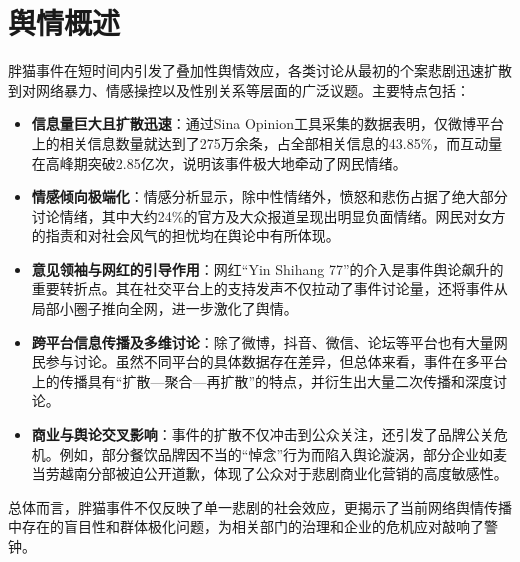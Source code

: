 \documentclass{article}
\begin{document}
\section{舆情概述}
胖猫事件在短时间内引发了叠加性舆情效应，各类讨论从最初的个案悲剧迅速扩散到对网络暴力、情感操控以及性别关系等层面的广泛议题。主要特点包括：
\begin{itemize}
    \item \textbf{信息量巨大且扩散迅速}：通过Sina Opinion工具采集的数据表明，仅微博平台上的相关信息数量就达到了275万余条，占全部相关信息的43.85\%，而互动量在高峰期突破2.85亿次，说明该事件极大地牵动了网民情绪。
    \item \textbf{情感倾向极端化}：情感分析显示，除中性情绪外，愤怒和悲伤占据了绝大部分讨论情绪，其中大约24\%的官方及大众报道呈现出明显负面情绪。网民对女方的指责和对社会风气的担忧均在舆论中有所体现。
    \item \textbf{意见领袖与网红的引导作用}：网红“Yin Shihang 77”的介入是事件舆论飙升的重要转折点。其在社交平台上的支持发声不仅拉动了事件讨论量，还将事件从局部小圈子推向全网，进一步激化了舆情。
    \item \textbf{跨平台信息传播及多维讨论}：除了微博，抖音、微信、论坛等平台也有大量网民参与讨论。虽然不同平台的具体数据存在差异，但总体来看，事件在多平台上的传播具有“扩散—聚合—再扩散”的特点，并衍生出大量二次传播和深度讨论。
    \item \textbf{商业与舆论交叉影响}：事件的扩散不仅冲击到公众关注，还引发了品牌公关危机。例如，部分餐饮品牌因不当的“悼念”行为而陷入舆论漩涡，部分企业如麦当劳越南分部被迫公开道歉，体现了公众对于悲剧商业化营销的高度敏感性。
\end{itemize}
总体而言，胖猫事件不仅反映了单一悲剧的社会效应，更揭示了当前网络舆情传播中存在的盲目性和群体极化问题，为相关部门的治理和企业的危机应对敲响了警钟。
\end{document}
